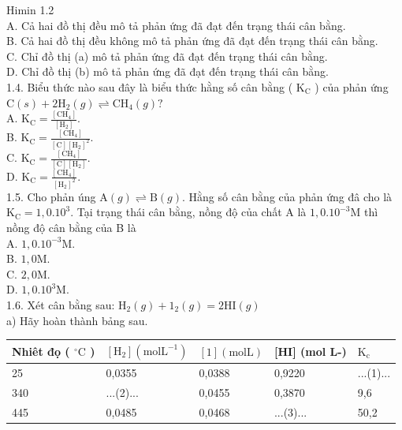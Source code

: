 \documentclass[10pt]{article}
\begin{document}
Himin 1.2\\
A. Cả hai đồ thị đều mô tả phản ứng đã đạt đến trạng thái cân bằng.\\
B. Cả hai đồ thị đều không mô tả phản ứng đã đạt đến trạng thái cân bằng.\\
C. Chỉ đồ thị (a) mô tả phản ứng đã đạt đến trạng thái cân bằng.\\
D. Chỉ đồ thị (b) mô tả phản ứng đã đạt đến trạng thái cân bằng.\\
1.4. Biểu thức nào sau đây là biểu thức hằng số cân bằng ( $\mathrm{K}_{\mathrm{C}}$ ) của phản ứng $\mathrm{C}(s)+2 \mathrm{H}_{2}(g) \rightleftharpoons \mathrm{CH}_{4}(g) ?$\\
A. $\mathrm{K}_{\mathrm{C}}=\frac{\left[\mathrm{CH}_{4}\right]}{\left[\mathrm{H}_{2}\right]}$.\\
B. $\mathrm{K}_{\mathrm{C}}=\frac{\left[\mathrm{CH}_{4}\right]}{[\mathrm{C}]\left[\mathrm{H}_{2}\right]^{2}}$.\\
C. $\mathrm{K}_{\mathrm{C}}=\frac{\left[\mathrm{CH}_{4}\right]}{[\mathrm{C}]\left[\mathrm{H}_{2}\right]}$.\\
D. $\mathrm{K}_{\mathrm{C}}=\frac{\left[\mathrm{CH}_{4}\right]}{\left[\mathrm{H}_{2}\right]^{2}}$.\\
1.5. Cho phản úng $\mathrm{A}(g) \rightleftharpoons \mathrm{B}(g)$. Hằng số cân bằng của phản ứng đâ cho là $\mathrm{K}_{\mathrm{C}}=1,0.10^{3}$. Tại trạng thái cân bằng, nồng độ của chất A là $1,0.10^{-3} \mathrm{M}$ thì nồng độ cân bằng của B là\\
A. $1,0.10^{-3} \mathrm{M}$.\\
B. $1,0 \mathrm{M}$.\\
C. $2,0 \mathrm{M}$.\\
D. $1,0.10^{3} \mathrm{M}$.\\
1.6. Xét cân bằng sau: $\mathrm{H}_{2}(g)+1_{2}(g)=2 \mathrm{HI}(g)$\\
a) Hãy hoàn thành bảng sau.

\begin{center}
\begin{tabular}{|l|l|l|l|l|}
\hline
Nhiêt đọ ( ${ }^{\circ} \mathrm{C}$ ) & $\left[\mathrm{H}_{2}\right]\left(\mathrm{mol} \mathrm{L}^{-1}\right)$ & $[1](\mathrm{mol} \mathrm{L})$ & [HI] (mol L-) & $\mathrm{K}_{\mathrm{c}}$ \\
\hline
25 & 0,0355 & 0,0388 & 0,9220 & ...(1)... \\
\hline
340 & ...(2)... & 0,0455 & 0,3870 & 9,6 \\
\hline
445 & 0,0485 & 0,0468 & ...(3)... & 50,2 \\
\hline
\end{tabular}
\end{center}
\end{document}
